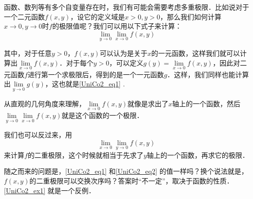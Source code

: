 

函数、数列等有多个自变量存在时，我们有可能会需要考虑多重极限．比如说对于一个二元函数$f(x, y)$，设它的定义域是$x>0, y>0$，那么我们如何计算$x\to 0, y\to 0$时$f$的极限值呢？我们可以用以下式子来计算：
\begin{equation}\label{UniCo2_eq1}
\lim\limits_{y\to 0}\lim\limits_{x\to 0}f(x, y)
\end{equation}

其中，对于任意$y>0$，$f(x, y)$可以认为是关于$x$的一元函数，这样我们就可以计算出$\lim\limits_{x\to 0}f(x, y)$．对于每个$y>0$，可以定义$g(y)=\lim\limits_{x\to 0}f(x, y)$，因此对二元函数$f$进行第一个求极限后，得到的是一个一元函数$g$．这样，我们同样也能计算出$\lim\limits_{y\to 0}g(y)$，这也就是\autoref{UniCo2_eq1} .

从直观的几何角度来理解，$\lim\limits_{x\to 0}f(x, y)$就像是求出了$x$轴上的一个函数，然后$\lim\limits_{y\to 0}\lim\limits_{x\to 0}f(x, y)$就是这个函数的一个极限．

我们也可以反过来，用
\begin{equation}\label{UniCo2_eq2}
\lim\limits_{x\to 0}\lim\limits_{y\to 0}f(x, y)
\end{equation}
来计算$f$的二重极限，这个时候就相当于先求了$y$轴上的一个函数，再求它的极限．

随之而来的问题是，\autoref{UniCo2_eq1} 和\autoref{UniCo2_eq2} 的值一样吗？换个说法就是，$f(x, y)$的二重极限可以交换次序吗？答案时“不一定”，取决于函数的性质．\autoref{UniCo2_ex1} 就是一个反例．

\begin{example}{}\label{UniCo2_ex1}

\end{example}






















